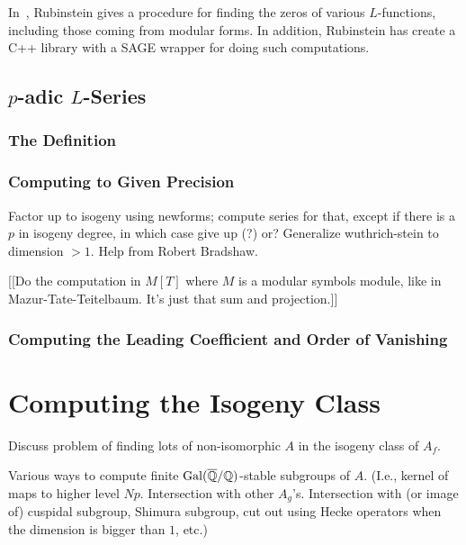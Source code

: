 \documentclass{article}
\begin{document}
In~\cite{MR2697494}, Rubinstein gives a procedure for finding the zeros of
various $L$-functions, including those coming from modular forms. In addition,
Rubinstein has create a C++ library with a SAGE wrapper for doing such
computations.

\subsection{$p$-adic $L$-Series}


\subsubsection{The Definition}

\subsubsection{Computing to Given Precision}
Factor up to isogeny using newforms; compute series for that,
except if there is a $p$ in isogeny degree, in which case give up (?) or?
Generalize wuthrich-stein to dimension $>1$.  Help from Robert Bradshaw.

[[Do the computation in $M[T]$ where $M$ is a modular symbols module, like
in Mazur-Tate-Teitelbaum.  It's just that sum and projection.]]

\subsubsection{Computing the Leading Coefficient and Order of Vanishing}


\section{Computing the Isogeny Class}

Discuss problem of finding lots of non-isomorphic $A$ in the isogeny
class of $A_f$.

Various ways to compute finite $\operatorname{Gal}(\overline{\mathbb{Q}}/\mathbb{Q})$-stable subgroups of
$A$.  (I.e., kernel of maps to higher level $Np$.  Intersection with
other $A_g$'s.  Intersection with (or image of) cuspidal subgroup,
Shimura subgroup, cut out using Hecke operators when the dimension is
bigger than $1$, etc.)
\end{document}
